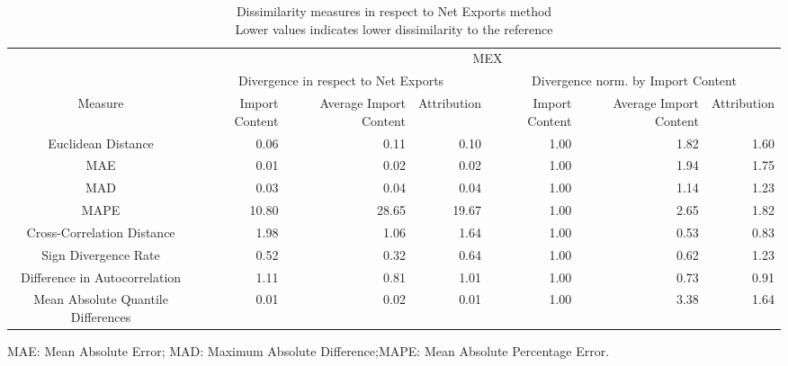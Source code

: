 \begin{table}[t]
\caption*{
{\large Dissimilarity measures in respect to Net Exports method} \\ 
{\small Lower values indicates lower dissimilarity to the reference}
} 
\fontsize{15.0pt}{18.0pt}\selectfont
\begin{tabular*}{\linewidth}{@{\extracolsep{\fill}}crrrrrr}
\toprule
 & \multicolumn{6}{c}{MEX} \\ 
\cmidrule(lr){2-7}
 & \multicolumn{3}{c}{Divergence in respect to Net Exports} & \multicolumn{3}{c}{Divergence norm. by Import Content} \\ 
\cmidrule(lr){2-4} \cmidrule(lr){5-7}
Measure & Import Content & Average Import Content & Attribution & Import Content & Average Import Content & Attribution \\ 
\midrule\addlinespace[2.5pt]
Euclidean Distance & 0.06 & 0.11 & 0.10 & 1.00 & 1.82 & 1.60 \\ 
MAE & 0.01 & 0.02 & 0.02 & 1.00 & 1.94 & 1.75 \\ 
MAD & 0.03 & 0.04 & 0.04 & 1.00 & 1.14 & 1.23 \\ 
MAPE & 10.80 & 28.65 & 19.67 & 1.00 & 2.65 & 1.82 \\ 
Cross-Correlation Distance & 1.98 & 1.06 & 1.64 & 1.00 & 0.53 & 0.83 \\ 
Sign Divergence Rate & 0.52 & 0.32 & 0.64 & 1.00 & 0.62 & 1.23 \\ 
Difference in Autocorrelation & 1.11 & 0.81 & 1.01 & 1.00 & 0.73 & 0.91 \\ 
Mean Absolute Quantile Differences & 0.01 & 0.02 & 0.01 & 1.00 & 3.38 & 1.64 \\ 
\bottomrule
\end{tabular*}
\begin{minipage}{\linewidth}
MAE: Mean Absolute Error; MAD: Maximum Absolute Difference;MAPE: Mean Absolute Percentage Error.\\
\end{minipage}
\end{table}

